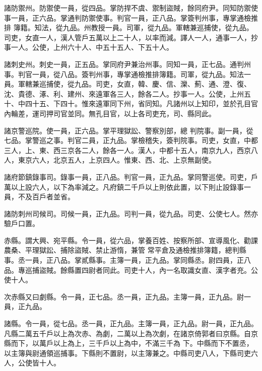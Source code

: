 \begin{pinyinscope}
 諸防禦州。防禦使一員，從四品。掌防捍不虞、禦制盜賊，餘同府尹。同知防禦使事一員，正六品。掌通判防禦使事。判官一員，正八品。掌簽判州事，專掌通檢推排
 簿籍。知法，從九品。州教授一員。司軍，從九品。軍轄兼巡捕使，從九品。司吏，女直一人，漢人管戶五萬以上二十人，以率而減。譯人一人，通事一人，抄事一人。公使，上州六十人、中五十五人、下五十人。



 諸刺史州。刺史一員，正五品。掌同府尹兼治州事。同知一員，正七品。通判州事。判官一員，從八品。簽判州事，專掌通檢推排簿籍。司軍，從九品。知法一員。軍轄兼巡捕使，從九品。司吏，女直，韓、慶、信、灤、薊、通、澄、復、沈、貴德、涿、利、建州、來遠軍各三人，餘各二人。抄事一人。公使，上州五十、中四十五、下四十。惟來遠軍同下州，省同知。凡諸州以上知印，並於孔目官內輪差，運司押司官並同。無孔目官，以上各司吏充，司、縣同此。



 諸京警巡院。使一員，正六品。掌平理獄訟、警察別部，總
 判院事。副一員，從七品。掌警巡之事。判官二員，正九品。掌檢稽失，簽判院事。司吏，女直，中都三人，上、東、西三京各二人，餘各一人。漢人，中都十五人，南京九人，西京八人，東京六人，北京五人，上京四人。惟東、西、北、上京無副使。



 諸府節鎮錄事司。錄事一員，正八品。判官一員，正九品。掌同警巡使。司吏，戶萬以上設六人，以下為率減之。凡府鎮二千戶以上則依此置，以下則止設錄事一員，不及百戶者並省。



 諸防刺州司候司。司候一員，正九品。司判一員，從九品。司吏、公使七人。然亦驗戶口置。



 赤縣。謂大興、宛平縣。令一員，從六品，掌養百姓、按察所部、宣導風化、勸課農桑、平理獄訟、捕除盜賊、禁止游惰，兼管
 常平倉及通檢推排簿籍，總判縣事。丞一員，正八品。掌貳縣事。主簿一員，正九品。掌同縣丞。尉四員，正八品。專巡捕盜賊。餘縣置四尉者同此。司吏十人，內一名取識女直、漢字者充。公使十人。



 次赤縣又曰劇縣。令一員，正七品。丞一員，正九品。主簿一員，正九品。尉一員，正九品。



 諸縣。令一員，從七品。丞一員，正九品。主簿一員，正九品。尉一員，正九品。凡縣二萬五千戶以上為次赤、為劇，二萬以上為次劇，在諸京倚郭者曰京縣。自京縣而下，以萬戶以上為上，三千戶以上為中，不滿三千為
 下。中縣而下不置丞，以主簿與尉通領巡捕事。下縣則不置尉，以主簿兼之。中縣司吏八人，下縣司吏六人，公使皆十人。




\end{pinyinscope}
